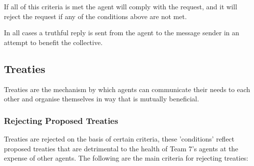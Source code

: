 If all of this criteria is met the agent will comply with the request, and it will reject the request if any of the conditions above are not met.

In all cases a truthful reply is sent from the agent to the message sender in an attempt to benefit the collective.

\subsection{Treaties}
\label{subsec: Treaties}
Treaties are the mechanism by which agents can communicate their needs to each other and organise themselves in way that is mutually beneficial.  

\subsubsection{Rejecting Proposed Treaties}
\label{subsec: Rejecting Treaties}
Treaties are rejected on the basis of certain criteria, these 'conditions' reflect proposed treaties that are detrimental to the health of Team 7's agents at the expense of other agents. The following are the main criteria for rejecting treaties:

